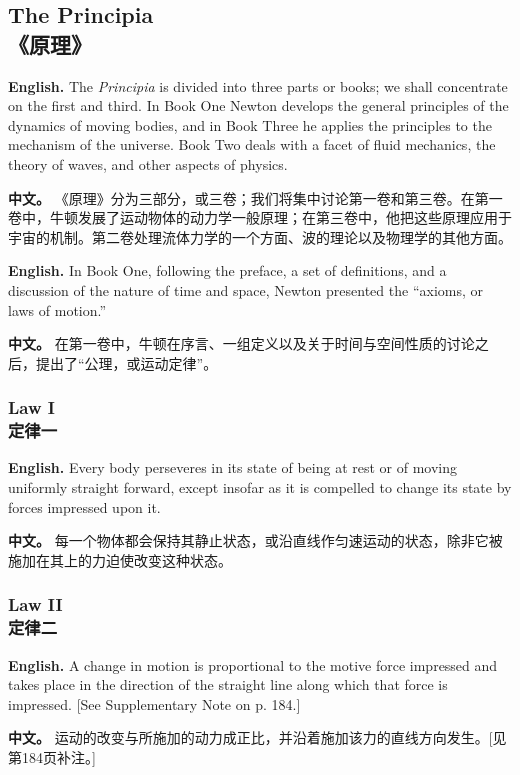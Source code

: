 \subsection*{The Principia\\《原理》}

\noindent\textbf{English.} The \emph{Principia} is divided into three parts or books; we shall concentrate on the first and third. In Book One Newton develops the general principles of the dynamics of moving bodies, and in Book Three he applies the principles to the mechanism of the universe. Book Two deals with a facet of fluid mechanics, the theory of waves, and other aspects of physics.
\par\noindent\textbf{中文。} 《原理》分为三部分，或三卷；我们将集中讨论第一卷和第三卷。在第一卷中，牛顿发展了运动物体的动力学一般原理；在第三卷中，他把这些原理应用于宇宙的机制。第二卷处理流体力学的一个方面、波的理论以及物理学的其他方面。
\medskip

\noindent\textbf{English.} In Book One, following the preface, a set of definitions, and a discussion of the nature of time and space, Newton presented the ``axioms, or laws of motion.''
\par\noindent\textbf{中文。} 在第一卷中，牛顿在序言、一组定义以及关于时间与空间性质的讨论之后，提出了“公理，或运动定律”。
\medskip

\subsubsection*{Law I\\定律一}
\noindent\textbf{English.} Every body perseveres in its state of being at rest or of moving uniformly straight forward, except insofar as it is compelled to change its state by forces impressed upon it.
\par\noindent\textbf{中文。} 每一个物体都会保持其静止状态，或沿直线作匀速运动的状态，除非它被施加在其上的力迫使改变这种状态。
\medskip

\subsubsection*{Law II\\定律二}
\noindent\textbf{English.} A change in motion is proportional to the motive force impressed and takes place in the direction of the straight line along which that force is impressed. [See Supplementary Note on p. 184.]
\par\noindent\textbf{中文。} 运动的改变与所施加的动力成正比，并沿着施加该力的直线方向发生。[见第184页补注。]
\medskip

